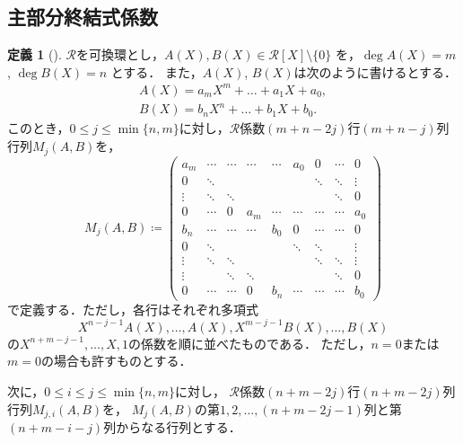 \documentclass[uplatex, dvipdfmx]{jsarticle}
\numberwithin{equation}{section}
\theoremstyle{definition}
\newtheorem{definition}{定義}[section]
\begin{document}
\subsection{主部分終結式係数}
\begin{definition}[{\cite[Definition 7.7.1]{MR1239443}}]
$\mathcal{R}$を可換環とし，$A(X), B(X) \in \mathcal{R}[X] \setminus \{0\}$ を，$\deg A(X) = m$, $\deg B(X) = n$ とする．
また，$A(X)$, $B(X)$は次のように書けるとする．
\begin{align}
     A(X) = a_m X^m + \dots + a_1 X + a_0, \\
     B(X) = b_n X^n + \dots + b_1 X + b_0.
\end{align}
このとき，$0 \leq j \leq \min\{n,m\}$に対し，$\mathcal{R}$係数$(m+n-2j)$行$(m+n-j)$列行列$M_j(A, B)$を，
\begin{equation}
     M_j(A, B) \coloneqq
     \begin{pmatrix}
          a_m    & \cdots & \cdots & \cdots & \cdots & a_0    & 0      & \cdots & 0      \\
          0      & \ddots &        &        &        &        & \ddots & \ddots & \vdots \\
          \vdots & \ddots & \ddots &        &        &        &        & \ddots & 0      \\
          0      & \cdots & 0      & a_m    & \cdots & \cdots & \cdots & \cdots & a_0    \\
          b_n    & \cdots & \cdots & \cdots & b_0    & 0      & \cdots & \cdots & 0      \\
          0      & \ddots &        &        &        & \ddots & \ddots &        & \vdots \\
          \vdots & \ddots & \ddots &        &        &        & \ddots & \ddots & \vdots \\
          \vdots &        & \ddots & \ddots &        &        &        & \ddots & 0      \\
          0      & \cdots & \cdots & 0      & b_n    & \cdots & \cdots & \cdots & b_0        
     \end{pmatrix}
\end{equation}
で定義する．ただし，各行はそれぞれ多項式
\begin{equation}
     X^{n-j-1}A(X), \dots, A(X), X^{m-j-1}B(X), \dots, B(X)
\end{equation}
の$X^{n+m-j-1}, \dots, X, 1$の係数を順に並べたものである．
ただし，$n=0$または$m=0$の場合も許すものとする．

次に，$0 \leq i \leq j \leq \min\{n,m\}$に対し，
$\mathcal{R}$係数$(n+m-2j)$行$(n+m-2j)$列行列$M_{j,i}(A,B)$を，
$M_j(A,B)$の第$1, 2,\dots, (n+m-2j-1)$列と第$(n+m-i-j)$列からなる行列とする．



\end{definition}
\end{document}
